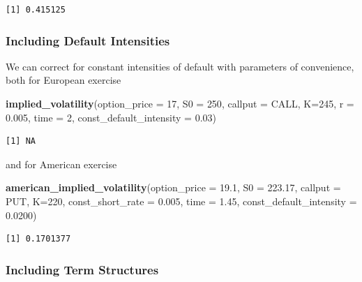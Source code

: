 \documentclass[]{article}
\newenvironment{Shaded}{\begin{snugshade}}{\end{snugshade}}
\newcommand{\DataTypeTok}[1]{\textcolor[rgb]{0.13,0.29,0.53}{#1}}
\newcommand{\DecValTok}[1]{\textcolor[rgb]{0.00,0.00,0.81}{#1}}
\newcommand{\FloatTok}[1]{\textcolor[rgb]{0.00,0.00,0.81}{#1}}
\newcommand{\KeywordTok}[1]{\textcolor[rgb]{0.13,0.29,0.53}{\textbf{#1}}}
\newcommand{\NormalTok}[1]{#1}
\begin{document}
\begin{verbatim}
[1] 0.415125
\end{verbatim}

\hypertarget{including-default-intensities}{%
\subsubsection{Including Default
Intensities}\label{including-default-intensities}}

We can correct for constant intensities of default with parameters of
convenience, both for European exercise

\begin{Shaded}
\begin{Highlighting}[]
\KeywordTok{implied_volatility}\NormalTok{(}\DataTypeTok{option_price =} \DecValTok{17}\NormalTok{, }
                   \DataTypeTok{S0 =} \DecValTok{250}\NormalTok{, }\DataTypeTok{callput =}\NormalTok{ CALL,  }\DataTypeTok{K=}\DecValTok{245}\NormalTok{,}
                   \DataTypeTok{r =} \FloatTok{0.005}\NormalTok{, }\DataTypeTok{time =} \DecValTok{2}\NormalTok{,}
                   \DataTypeTok{const_default_intensity =} \FloatTok{0.03}\NormalTok{)}
\end{Highlighting}
\end{Shaded}

\begin{verbatim}
[1] NA
\end{verbatim}

and for American exercise

\begin{Shaded}
\begin{Highlighting}[]
\KeywordTok{american_implied_volatility}\NormalTok{(}\DataTypeTok{option_price =} \FloatTok{19.1}\NormalTok{, }
     \DataTypeTok{S0 =} \FloatTok{223.17}\NormalTok{, }\DataTypeTok{callput =}\NormalTok{ PUT, }\DataTypeTok{K=}\DecValTok{220}\NormalTok{, }
     \DataTypeTok{const_short_rate =} \FloatTok{0.005}\NormalTok{, }\DataTypeTok{time =} \FloatTok{1.45}\NormalTok{,}
     \DataTypeTok{const_default_intensity =} \FloatTok{0.0200}\NormalTok{)}
\end{Highlighting}
\end{Shaded}

\begin{verbatim}
[1] 0.1701377
\end{verbatim}

\hypertarget{including-term-structures}{%
\subsubsection{Including Term
Structures}\label{including-term-structures}}
\end{document}
